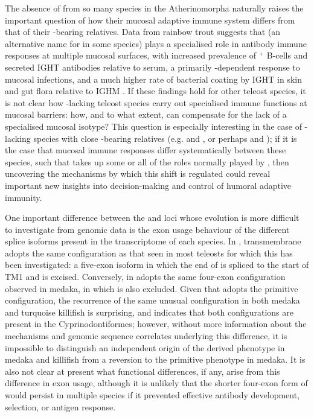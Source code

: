 The absence of  from so many species in the Atherinomorpha naturally raises the important question of how their mucosal adaptive immune system differs from that of their -bearing relatives. Data from rainbow trout suggests that  (an alternative name for  in some species) plays a specialised role in antibody immune responses at multiple mucosal surfaces, with increased prevalence of $^+$ B-cells and secreted IGHT antibodies relative to serum, a primarily -dependent response to mucosal infections, and a much higher rate of bacterial coating by IGHT in skin and gut flora relative to IGHM \parencite{zhang2010igtgut,xu2013igtskin}.
If these findings hold for other teleost species, it is not clear how -lacking teleost species carry out specialised immune functions at mucosal barriers: how, and to what extent, can  compensate for the lack of a specialised mucosal isotype? This question is especially interesting in the case of -lacking species with close -bearing relatives (e.g. \nfu and , or perhaps  and ); if it is the case that mucosal immune responses differ systematically between these species, such that  takes up some or all of the roles normally played by , then uncovering the mechanisms by which this shift is regulated could reveal important new insights into decision-making and control of humoral adaptive immunity.

One important difference between the \Xma and \Nfu loci whose evolution is more difficult to investigate from genomic data is the exon usage behaviour of the different splice isoforms present in the transcriptome of each species. In \Xma, transmembrane  adopts the same configuration as that seen in most teleosts for which this has been investigated: a five-exon isoform in which the end of  is spliced to the start of TM1 and  is excised. Conversely, in \Nfu {} adopts the same four-exon configuration observed in medaka, in which  is also excluded. Given that \Xma adopts the primitive configuration, the recurrence of the same unusual configuration in both medaka and turquoise killifish is surprising, and indicates that both configurations are present in the Cyprinodontiformes; however, without more information about the mechanisms and genomic sequence correlates underlying this difference, it is impossible to distinguish an independent origin of the derived phenotype in medaka and killifish from a reversion to the primitive phenotype in medaka. It is also not clear at present what functional differences, if any, arise from this difference in exon usage, although it is unlikely that the shorter four-exon form of  would persist in multiple species if it prevented effective antibody development, selection, or antigen response.

